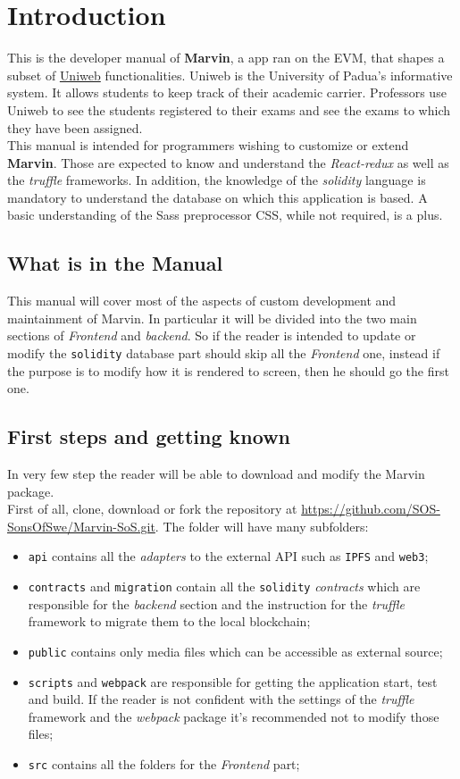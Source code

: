 \section{Introduction}
This is the developer manual of \textbf{Marvin}, a \DH app ran on the EVM, that shapes a subset of \href{www.uniweb.unipd.it}{Uniweb} functionalities. Uniweb is the University of Padua's informative system.
It allows students to keep track of their academic carrier. Professors use Uniweb to see the students registered to their exams and see the exams to which they have been assigned.
\\This manual is intended for programmers wishing to customize or extend \textbf{Marvin}. Those are expected to know and understand the \emph{React-redux} as well as the \emph{truffle} frameworks. In addition, the knowledge of the \emph{solidity} language is mandatory to understand the database on which this application is based. A basic understanding of the Sass preprocessor CSS, while not required, is a plus.

\subsection{What is in the Manual}
This manual will cover most of the aspects of custom development and maintainment of Marvin.
In particular it will be divided into the two main sections of \emph{Frontend} and \emph{backend}. So if the reader is intended to update or modify the \verb|solidity| database part should skip all the \emph{Frontend} one, instead if the purpose is to modify how it is rendered to screen, then he should go the first one.

\subsection{First steps and getting known}
In very few step the reader will be able to download and modify the Marvin package. 
\\First of all, clone, download or fork the repository at \url{https://github.com/SOS-SonsOfSwe/Marvin-SoS.git}. The folder will have many subfolders:
\begin{itemize}
	\item \verb|api| contains all the \emph{adapters} to the external API such as \verb|IPFS| and \verb|web3|;
	\item \verb|contracts| and \verb|migration| contain all the \verb|solidity| \emph{contracts} which are responsible for the \emph{backend} section and the instruction for the \emph{truffle} framework to migrate them to the local blockchain;
	\item \verb|public| contains only media files which can be accessible as external source;
	\item \verb|scripts| and \verb|webpack| are responsible for getting the application start, test and build. If the reader is not confident with the settings of the \emph{truffle} framework and the \emph{webpack} package it's recommended not to modify those files;
	\item \verb|src| contains all the folders for the \emph{Frontend} part;
\end{itemize}

